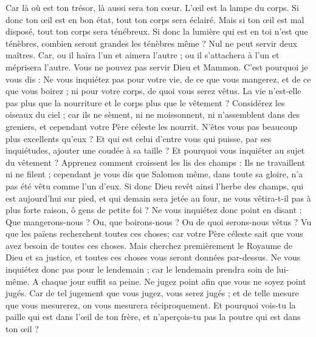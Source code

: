 \begin{multicols}{2}
Car là où est ton trésor, là aussi sera ton cœur.
L'œil est la lampe du corps. Si donc ton œil est en bon état, tout ton corps sera éclairé.
Mais si ton œil est mal disposé, tout ton corps sera ténébreux. Si donc la lumière qui est en toi n'est que ténèbres, combien seront grandes les ténèbres même ?
Nul ne peut servir deux maîtres. Car, ou il haïra l'un et aimera l'autre ; ou il s'attachera à l'un et méprisera l'autre. Vous ne pouvez pas servir Dieu et Mammon.
C'est pourquoi je vous dis : Ne vous inquiétez pas pour votre vie, de ce que vous mangerez, et de ce que vous boirez ; ni pour votre corps, de quoi vous serez vêtus. La vie n'est-elle pas plus que la nourriture et le corps plus que le vêtement ?
Considérez les oiseaux du ciel ; car ils ne sèment, ni ne moissonnent, ni n'assemblent dans des greniers, et cependant votre Père céleste les nourrit. N'êtes vous pas beaucoup plus excellents qu'eux ?
Et qui est celui d'entre vous qui puisse, par ses inquiétudes, ajouter une coudée à sa taille ?
Et pourquoi vous inquiéter au sujet du vêtement ? Apprenez comment croissent les lis des champs : Ils ne travaillent ni ne filent ;
cependant je vous dis que Salomon même, dans toute sa gloire, n'a pas été vêtu comme l'un d'eux.
Si donc Dieu revêt ainsi l'herbe des champs, qui est aujourd'hui sur pied, et qui demain sera jetée au four, ne vous vêtira-t-il pas à plus forte raison, ô gens de petite foi ?
Ne vous inquiétez donc point en disant : Que mangerons-nous ? Ou, que boirons-nous ? Ou de quoi serons-nous vêtus ?
Vu que les païens recherchent toutes ces choses; car votre Père céleste sait que vous avez besoin de toutes ces choses.
Mais cherchez premièrement le Royaume de Dieu et sa justice, et toutes ces choses vous seront données par-dessus.
Ne vous inquiétez donc pas pour le lendemain ; car le lendemain prendra soin de lui-même. A chaque jour suffit sa peine.
\VerseOne{}Ne jugez point afin que vous ne soyez point jugés.
Car de tel jugement que vous jugez, vous serez jugés ; et de telle mesure que vous mesurerez, on vous mesurera réciproquement.
Et pourquoi vois-tu la paille qui est dans l'œil de ton frère, et n'aperçois-tu pas la poutre qui est dans ton œil ?

\end{multicols}
